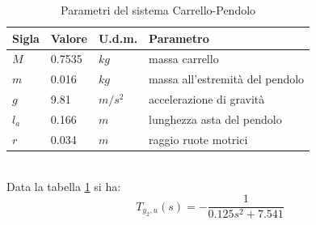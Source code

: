 \begin{table}[ht]
	\begin{tabular}{|l|l|l|l|}
		\hline
		\textbf{Sigla} & \textbf{Valore} & \textbf{U.d.m.} & \textbf{Parametro}\\
		\hline
		$M$ & 0.7535 & $kg$ & massa carrello\\
		\hline
		$m$ & 0.016 & $kg$ & massa all'estremità del pendolo\\
		\hline
		$g$ & 9.81 & $m/s^2$ & accelerazione di gravità\\
		\hline
		$l_a$ & 0.166 & $m$ & lunghezza asta del pendolo\\
		\hline
		$r$ & 0.034 & $m$ & raggio ruote motrici\\
		\hline
	
	\end{tabular}	
\caption{Parametri del sistema Carrello-Pendolo}
\label{carrPend}
\end{table}
\\Data la tabella \ref{carrPend} si ha:
$$T_{y_2,u}(s)=-\displaystyle\frac{1}{0.125s^2+7.541}$$
\newpage
